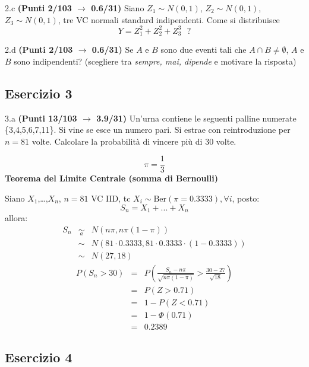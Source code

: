 \documentclass[
  11pt,
]{book}
\theoremstyle{mytheoremstyle}
\theoremstyle{mydefstyle}
\newenvironment{sol}
  {
  \begin{tcolorbox}[enhanced,breakable,arc=0.1mm,boxrule=1pt,colback=white,colframe=iblue,
  title=\bf \fontfamily{lmss}\selectfont \hspace{.5 cm} Soluzione,drop fuzzy shadow]

}{
\end{tcolorbox}
  }
\begin{document}
2.c \textbf{(Punti 2/103 \(\rightarrow\) 0.6/31)} Siano \(Z_1\sim N(0,1)\), \(Z_2\sim N(0,1)\), \(Z_3\sim N(0,1)\), tre VC normali standard indipendenti.
Come si distribuisce
\[
Y=Z_1^2+Z_2^2+Z_3^3~~~?
\]

2.d \textbf{(Punti 2/103 \(\rightarrow\) 0.6/31)} Se \(A\) e \(B\) sono due eventi tali che \(A\cap B\ne\emptyset\), \(A\) e \(B\) sono indipendenti? (scegliere tra \emph{sempre, mai, dipende} e motivare la risposta)

\subsection{Esercizio 3}\label{esercizio-3-31}

3.a \textbf{(Punti 13/103 \(\rightarrow\) 3.9/31)} Un'urna contiene le seguenti palline numerate \{3,4,5,6,7,11\}. Si vine se esce un numero pari. Si estrae con reintroduzione per \(n=81\) volte.
Calcolare la probabilità di vincere più di 30 volte.

\begin{sol}
\[\pi=\frac 13\]
\textbf{Teorema del Limite Centrale (somma di Bernoulli)}

Siano \(X_1\),\ldots,\(X_n\), \(n=81\) VC IID, tc \(X_i\sim\text{Ber}(\pi=0.3333)\)\(,\forall i\), posto:
\[
      S_n = X_1 + ... + X_n
      \]
allora:\begin{eqnarray*}
  S_n & \mathop{\sim}\limits_{a}& N(n\pi,n\pi(1-\pi)) \\
      &\sim & N(81\cdot0.3333,81\cdot0.3333\cdot(1-0.3333)) \\
      &\sim & N(27,18)
  \end{eqnarray*}\begin{eqnarray*}
      P( S_n   >   30 ) 
        &=& P\left(  \frac { S_n  -  n\pi }{ \sqrt{n\pi(1-\pi)} }  >  \frac { 30  -  27 }{\sqrt{ 18 }} \right)  \\
                 &=& P\left(  Z   >   0.71 \right) \\    &=& 1-P(Z< 0.71 )\\ 
                 &=&  1-\Phi( 0.71 ) \\ &=&  0.2389 
      \end{eqnarray*}

\end{sol}

\subsection{Esercizio 4}\label{esercizio-4-31}
\end{document}
